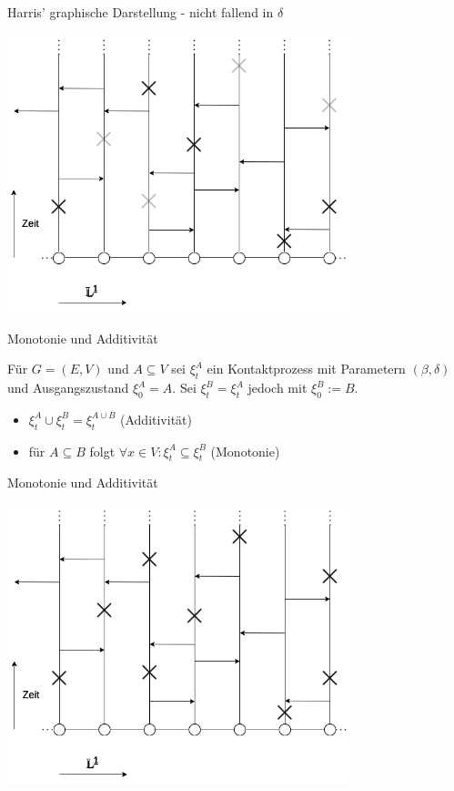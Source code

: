 \documentclass[11pt]{beamer}
\begin{document}
\begin{frame}{Harris' graphische Darstellung - nicht fallend in $\delta$}
    \begin{center}
        \includegraphics[width=0.75\textwidth]{images/contact process dotted crosses.png}
    \end{center}
\end{frame}

\begin{frame}{Monotonie und Additivität}
    
    Für $G = (E, V)$ und $A \subseteq V$ sei $\xi_t^A$ ein Kontaktprozess mit
    Parametern $(\beta, \delta)$ und Ausgangszustand $\xi_0^A = A$. 
    Sei $\xi_t^B = \xi_t^A$ jedoch mit $\xi_0^B := B$. 
    \begin{itemize}
        \item<2-> $\xi_t^A \cup \xi_t^B = \xi_t^{A \cup B}$ (Additivität)
        \item<3-> für $A \subseteq B$ folgt $\forall x \in V : \xi_t^A \subseteq \xi_t^B$ (Monotonie)
    \end{itemize}
\end{frame}

\begin{frame}{Monotonie und Additivität}
    \begin{center}
        \includegraphics[width=0.75\textwidth]{images/contact process arrows.png}
    \end{center}
\end{frame}
\end{document}
